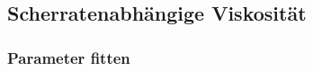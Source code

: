 \section{}
\label{Kapitel:Implementation}
%
\subsection{\openfoam{}}
%
\subsection{Scherratenabhängige Viskosität}
\subsubsection{Parameter fitten}
